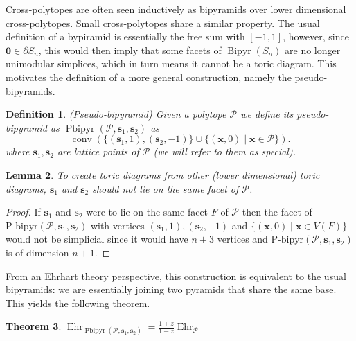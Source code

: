 \documentclass[a4paper,11pt,reqno]{amsart}
\DeclareMathOperator{\conv}{conv}
\DeclareMathOperator{\Ehr}{Ehr}
\DeclareMathOperator{\Bipyr}{Bipyr}
\DeclareMathOperator{\Pbipyr}{Pbipyr}
\newtheorem{theorem}{Theorem}[section]
\newtheorem{lemma}[theorem]{Lemma}
\newtheorem{definition}[theorem]{Definition}
\begin{document}
Cross-polytopes are often seen inductively as bipyramids over lower dimensional cross-polytopes. 
Small cross-polytopes share a similar property. The usual definition of a bypiramid is essentially the 
free sum with $[-1, 1]$, however, since $\bm{0} \in \partial S_n$, this would then imply that some facets 
of $\Bipyr (S_n)$ are no longer unimodular simplices, which in turn means it cannot be a toric diagram. 
This motivates the definition of a more general construction, namely the pseudo-bipyramids.
\begin{definition}{(Pseudo-bipyramid)} \label{def:ppyr}
Given a polytope $\mathcal{P}$ we define its pseudo-bipyramid as ${\Pbipyr} (\mathcal{P}, \bm{s}_1, \bm{s}_2)$ as
\[
\conv (\{(\bm{s}_1, 1), (\bm{s}_2, -1) \} \cup \{ (\bm{x}, 0) \mid \bm{x} \in \mathcal{P} \} ).
\]
where $\bm{s}_1, \bm{s}_2$ are lattice points of $\mathcal{P}$ (we will refer to them as special).
\end{definition}
\begin{lemma} \label{lemma:simplicial}
To create toric diagrams from other (lower dimensional) toric diagrams, $\bm{s}_1$ and $\bm{s}_2$ 
should not lie on the same facet of $\mathcal{P}$.
\end{lemma}
\begin{proof} 
If $\bm{s}_1$ and $\bm{s}_2$ were to lie on the same facet $F$ of $\mathcal{P}$ then the facet of 
$\text{P-bipyr}(\mathcal{P}, \bm{s}_1, \bm{s}_2)$ with vertices $(\bm{s}_1, 1), (\bm{s}_2, -1)$ and 
$ \{(\bm{x},0) \mid \bm{x} \in V(F)\}$ would not be simplicial since it would have $n+3$ vertices and 
$\text{P-bipyr}(\mathcal{P}, \bm{s}_1, \bm{s}_2)$ is of dimension $n+1$.
\end{proof}
\noindent From an Ehrhart theory perspective, this construction is equivalent to the usual bipyramids: we are essentially 
joining two pyramids that share the same base. This yields the following theorem.
\begin{theorem} \label{teo:6}
$\Ehr_{\Pbipyr (\mathcal{P}, \bm{s}_1, \bm{s}_2)}=\frac{1+z}{1-z} \Ehr_\mathcal{P}$
\end{theorem}
\end{document}
